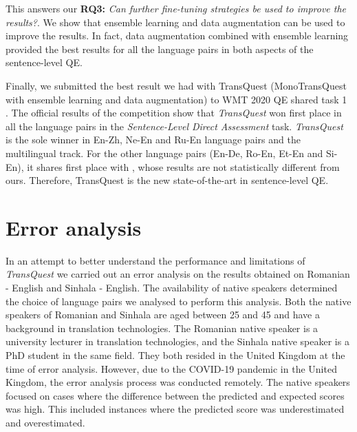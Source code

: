 This answers our \textbf{RQ3:} \textit{Can further fine-tuning strategies be used to improve the results?}. We show that ensemble learning and data augmentation can be used to improve the results. In fact, data augmentation combined with ensemble learning provided the best results for all the language pairs in both aspects of the sentence-level QE. 

Finally, we submitted the best result we had with TransQuest (MonoTransQuest with ensemble learning and data augmentation) to WMT 2020 QE shared task 1 \autocite{specia-etal-2020-findings-wmt}. The official results of the competition show that \textit{TransQuest} won first place in all the language pairs in the \textit{Sentence-Level Direct Assessment} task. \textit{TransQuest} is the sole winner in En-Zh, Ne-En and Ru-En language pairs and the multilingual track. For the other language pairs (En-De, Ro-En, Et-En and Si-En), it shares first place with \autocite{fomicheva-etal-2020-bergamot}, whose results are not statistically different from ours. Therefore, TransQuest is the new state-of-the-art in sentence-level QE.

\section{Error analysis}
\label{sec:transquest_error}

In an attempt to better understand the performance and limitations of \textit{TransQuest} we carried out an error analysis on the results obtained on Romanian - English and Sinhala - English. The availability of native speakers determined the choice of language pairs we analysed to perform this analysis. Both the native speakers of Romanian and Sinhala are aged between 25 and 45 and have a background in translation technologies. The Romanian native speaker is a university lecturer in translation technologies, and the Sinhala native speaker is a PhD student in the same field. They both resided in the United Kingdom at the time of error analysis. However, due to the COVID-19 pandemic in the United Kingdom, the error analysis process was conducted remotely. The native speakers focused on cases where the difference between the predicted and expected scores was high. This included instances where the predicted score was underestimated and overestimated.

